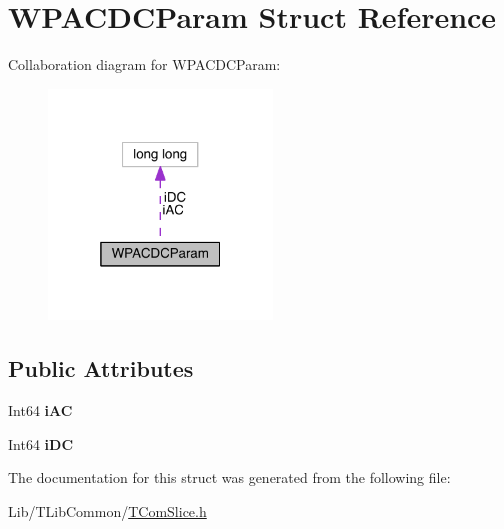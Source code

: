 \hypertarget{struct_w_p_a_c_d_c_param}{}\section{W\+P\+A\+C\+D\+C\+Param Struct Reference}
\label{struct_w_p_a_c_d_c_param}


Collaboration diagram for W\+P\+A\+C\+D\+C\+Param\+:
\nopagebreak
\begin{figure}[H]
\begin{center}
\leavevmode
\includegraphics[width=169pt]{de/df9/struct_w_p_a_c_d_c_param__coll__graph}
\end{center}
\end{figure}
\subsection*{Public Attributes}
\begin{DoxyCompactItemize}
\item 
\mbox{\label{struct_w_p_a_c_d_c_param_a1ebeac3b6d5f7d655a3a10a008095eb8}} 
Int64 {\bfseries i\+AC}
\item 
\mbox{\label{struct_w_p_a_c_d_c_param_a197e1a638907ca108acb6d22438cf27f}} 
Int64 {\bfseries i\+DC}
\end{DoxyCompactItemize}


The documentation for this struct was generated from the following file\+:\begin{DoxyCompactItemize}
\item 
Lib/\+T\+Lib\+Common/\hyperlink{_t_com_slice_8h}{T\+Com\+Slice.\+h}\end{DoxyCompactItemize}
